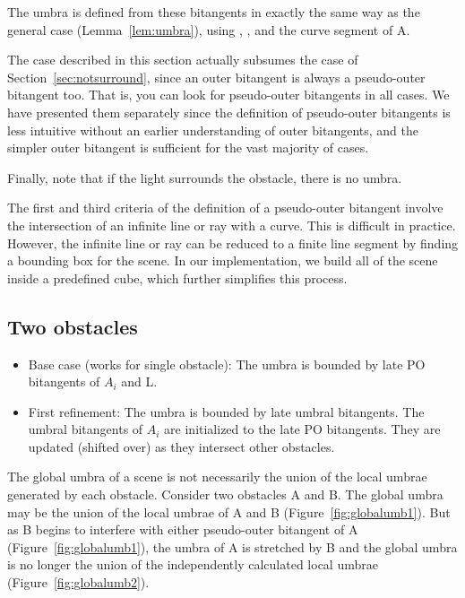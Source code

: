\documentclass[12pt]{article}
\begin{document}
The umbra is defined from these bitangents in exactly the same way as
the general case (Lemma~\ref{lem:umbra}), 
using , , and the curve segment  of A.

The case described in this section actually subsumes the case of 
Section~\ref{sec:notsurround}, since an outer bitangent is always
a pseudo-outer bitangent too.
That is, you can look for pseudo-outer bitangents
in all cases.
We have presented them separately
since the definition of pseudo-outer bitangents is less intuitive
without an earlier understanding of outer bitangents,
and the simpler outer bitangent is sufficient for the vast majority of cases.

Finally, note that if the light surrounds the obstacle, there is no umbra.

\begin{implementation}
The first and third criteria of the definition of a pseudo-outer bitangent
involve the intersection of an infinite line or ray with a curve.
This is difficult in practice.
However, the infinite line or ray can be reduced to a finite line segment by 
finding a bounding box for the scene.
In our implementation, we build all of the scene inside
a predefined cube, which further simplifies this process.
\end{implementation}

\clearpage


\subsection{Two obstacles}

\begin{itemize}
\item 
Base case (works for single obstacle): 
	The umbra is bounded by late PO bitangents of $A_i$ and L.
\item 
First refinement: 
	The umbra is bounded by late umbral bitangents.
	The umbral bitangents of $A_i$ are initialized to the late PO bitangents.
	They are updated (shifted over) as they intersect other obstacles.
\end{itemize}

The global umbra of a scene is not necessarily the union of the local umbrae 
generated by each obstacle.
Consider two obstacles A and B.
The global umbra may be the union of the local umbrae of A and B 
(Figure~\ref{fig:globalumb1}).
But as B begins to interfere with either pseudo-outer bitangent of A
(Figure~\ref{fig:globalumb1}), the umbra of A is stretched by B
and the global umbra is no longer the union of the independently calculated
local umbrae (Figure~\ref{fig:globalumb2}).
\end{document}
